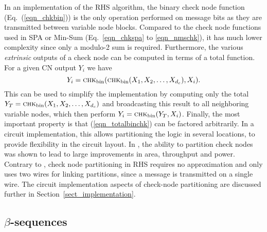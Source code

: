 \documentclass[12pt,journal,twoside,draftcls,onecolumn]{IEEEtran}
\newcommand{\cnfct}{\textsc{chk}_{\mathrm{bin}}}
\begin{document}
In an implementation of the RHS algorithm, the binary check node function (Eq.~(\ref{eqn_chkbin})) is the only operation performed on message bits as they are transmitted between variable node blocks.
Compared to the check node functions used in SPA or Min-Sum (Eq.~\ref{eqn_chkspa} to \ref{eqn_nmschk}), it has much lower complexity since only a modulo-2 sum is required. Furthermore, the various \emph{extrinsic} outputs of a check node can be computed in terms of a total function. For a given CN output $Y_i$ we have
\begin{equation}
\label{eqn_totalbinchk}
Y_i = \cnfct(\cnfct(X_1, X_2, \ldots , X_{d_c}), X_i).
\end{equation}
This can be used to simplify the implementation by computing only the total $Y_T = \cnfct(X_1,\allowbreak X_2,\allowbreak\ldots , X_{d_c})$ 
and broadcasting this result to all neighboring variable nodes, which then perform $Y_i = \cnfct(Y_T, X_i)$.
Finally, the most important property is that (\ref{eqn_totalbinchk}) can be factored arbitrarily. In a circuit implementation, this allows partitioning the logic in several locations, to provide flexibility in the circuit layout. In \cite{mohsenin:2010}, the ability to partition check nodes was shown to lead to large improvements in area, throughput and power. Contrary to \cite{mohsenin:2010}, check node partitioning in RHS requires no approximation and only uses two wires for linking partitions, since a message is transmitted on a single wire.
The circuit implementation aspects of check-node partitioning are discussed further in Section~\ref{sect_implementation}.


\subsection{$\beta$-sequences}
\label{sect_relaxation}
\end{document}
